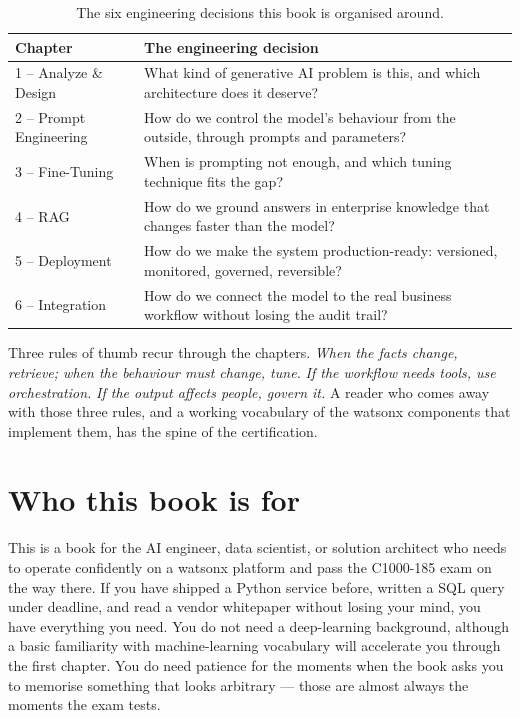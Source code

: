 \begin{table}[h]
\centering
\small
\begin{tabularx}{\textwidth}{l X}
\toprule
\textbf{Chapter} & \textbf{The engineering decision} \\
\midrule
1 -- Analyze \& Design       & What kind of generative AI problem is this, and which architecture does it deserve? \\
2 -- Prompt Engineering      & How do we control the model's behaviour from the outside, through prompts and parameters? \\
3 -- Fine-Tuning             & When is prompting not enough, and which tuning technique fits the gap? \\
4 -- RAG                     & How do we ground answers in enterprise knowledge that changes faster than the model? \\
5 -- Deployment              & How do we make the system production-ready: versioned, monitored, governed, reversible? \\
6 -- Integration             & How do we connect the model to the real business workflow without losing the audit trail? \\
\bottomrule
\end{tabularx}
\caption{The six engineering decisions this book is organised around.}
\label{tab:decisions}
\end{table}

Three rules of thumb recur through the chapters. \emph{When the facts change, retrieve; when the behaviour must change, tune.} \emph{If the workflow needs tools, use orchestration.} \emph{If the output affects people, govern it.} A reader who comes away with those three rules, and a working vocabulary of the watsonx components that implement them, has the spine of the certification.

\section*{Who this book is for}

This is a book for the AI engineer, data scientist, or solution architect who needs to operate confidently on a watsonx platform and pass the C1000-185 exam on the way there. If you have shipped a Python service before, written a SQL query under deadline, and read a vendor whitepaper without losing your mind, you have everything you need. You do not need a deep-learning background, although a basic familiarity with machine-learning vocabulary will accelerate you through the first chapter. You do need patience for the moments when the book asks you to memorise something that looks arbitrary --- those are almost always the moments the exam tests.

